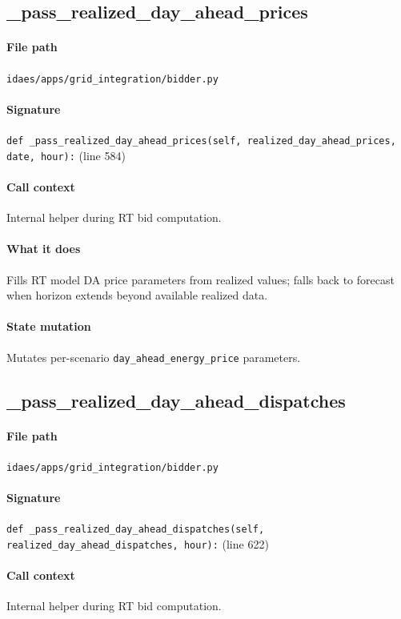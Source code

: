 \documentclass{article}
\begin{document}
\subsection{\_pass\_realized\_day\_ahead\_prices}\label{fn:pass_realized_day_ahead_prices}
\paragraph{File path} \texttt{idaes/apps/grid\_integration/bidder.py}
\paragraph{Signature} \texttt{def \_pass\_realized\_day\_ahead\_prices(self, realized\_day\_ahead\_prices, date, hour):} (line 584)
\paragraph{Call context} Internal helper during RT bid computation.
\paragraph{What it does} Fills RT model DA price parameters from realized values; falls back to forecast when horizon extends beyond available realized data.
\paragraph{State mutation} Mutates per-scenario \texttt{day\_ahead\_energy\_price} parameters.

\subsection{\_pass\_realized\_day\_ahead\_dispatches}\label{fn:pass_realized_day_ahead_dispatches}
\paragraph{File path} \texttt{idaes/apps/grid\_integration/bidder.py}
\paragraph{Signature} \texttt{def \_pass\_realized\_day\_ahead\_dispatches(self, realized\_day\_ahead\_dispatches, hour):} (line 622)
\paragraph{Call context} Internal helper during RT bid computation.
\end{document}
